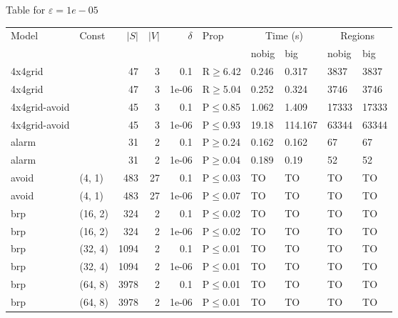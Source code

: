 \small Table for \(\varepsilon=1e-05\)
\begin{longtable}{llrrrlllll}

        \toprule
        Model & Const & $|S|$ & $|V|$ & $\delta$ & Prop & \multicolumn{2}{c}{Time (s)} & \multicolumn{2}{c}{Regions} \\
        \cmidrule(ll){7-8} \cmidrule(ll){9-10}
        & & & & & & nobig & big & nobig & big \\
        \midrule
        
 4x4grid       &           &     	47 &   3 & 0.1   & R$\geq$6.42  & 0.246    & 0.317    & 3837    & 3837    \\
 4x4grid       &           &     	47 &   3 & 1e-06 & R$\geq$5.04  & 0.252    & 0.324    & 3746    & 3746    \\
 4x4grid-avoid &           &     	45 &   3 & 0.1   & P$\leq$0.85  & 1.062    & 1.409    & 17333   & 17333   \\
 4x4grid-avoid &           &     	45 &   3 & 1e-06 & P$\leq$0.93  & 19.18    & 114.167  & 63344   & 63344   \\
 alarm         &           &     	31 &   2 & 0.1   & P$\geq$0.24  & 0.162    & 0.162    & 67      & 67      \\
 alarm         &           &     	31 &   2 & 1e-06 & P$\geq$0.04  & 0.189    & 0.19     & 52      & 52      \\
 avoid         & (4, 1)    &    	483 &  27 & 0.1   & P$\leq$0.03  & TO       & TO       & TO      & TO      \\
 avoid         & (4, 1)    &    	483 &  27 & 1e-06 & P$\leq$0.07  & TO       & TO       & TO      & TO      \\
 brp           & (16, 2)   &    	324 &   2 & 0.1   & P$\leq$0.02  & TO       & TO       & TO      & TO      \\
 brp           & (16, 2)   &    	324 &   2 & 1e-06 & P$\leq$0.02  & TO       & TO       & TO      & TO      \\
 brp           & (32, 4)   &   	1094 &   2 & 0.1   & P$\leq$0.01  & TO       & TO       & TO      & TO      \\
 brp           & (32, 4)   &   	1094 &   2 & 1e-06 & P$\leq$0.01  & TO       & TO       & TO      & TO      \\
 brp           & (64, 8)   &   	3978 &   2 & 0.1   & P$\leq$0.01  & TO       & TO       & TO      & TO      \\
 brp           & (64, 8)   &   	3978 &   2 & 1e-06 & P$\leq$0.01  & TO       & TO       & TO      & TO      \\

\end{longtable}
